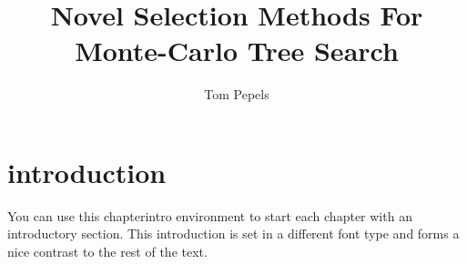 \documentclass{kecsmstr}
\title{Novel Selection Methods For Monte-Carlo Tree Search}
\author{Tom Pepels}
\begin{document}
\makeheaders {} \maketitle \setcounter{page}{2}
\emptypage

 \emptypage

 \emptypage

\tableofcontents  \emptypage {}

\chapter{introduction}

\begin{chapterintro}
You can use this chapterintro environment to start each chapter
with an introductory section. This introduction is set in a
different font type and forms a nice contrast to the rest of the
text.
\end{chapterintro}
\end{document}
